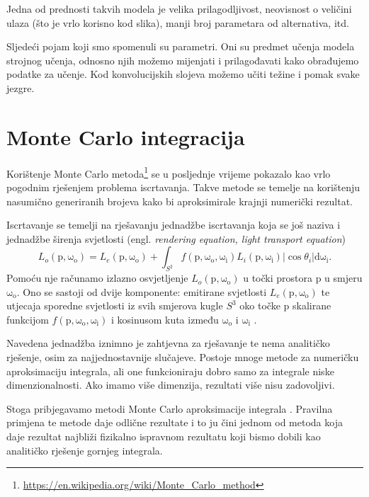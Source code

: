 \documentclass[times, utf8, seminar, numeric]{fer}
\newcommand{\eng}[1]{(engl. \textsl{#1}\/)}
\newcommand{\vect}[1]{\bm{\mathrm{#1}}}
\begin{document}
Jedna od prednosti takvih modela je velika prilagodljivost, neovisnost o veličini ulaza (što je
vrlo korisno kod slika), manji broj parametara od alternativa, itd.

Sljedeći pojam koji smo spomenuli su parametri. Oni su predmet učenja modela strojnog učenja,
odnosno njih možemo mijenjati i prilagođavati kako obrađujemo podatke za učenje. Kod
konvolucijskih slojeva možemo učiti težine i pomak svake jezgre.


\section{Monte Carlo integracija}
Korištenje Monte Carlo metoda\footnote{\url{https://en.wikipedia.org/wiki/Monte_Carlo_method}} se
u posljednje vrijeme pokazalo kao vrlo pogodnim rješenjem problema iscrtavanja. Takve metode se
temelje na korištenju nasumično generiranih brojeva kako bi aproksimirale krajnji numerički
rezultat.

Iscrtavanje se temelji na rješavanju jednadžbe iscrtavanja koja se još naziva i jednadžbe širenja
svjetlosti \eng{rendering equation, light transport equation}
\begin{equation} \label{eq:1}
  L_o(\vect{p}, \vect{\omega_o}) = L_e(\vect{p}, \vect{\omega_o}) + \int_{S^2} f(\vect{p}, \vect{\omega_o}, \vect{\omega_i})
  L_i(\vect{p}, \vect{\omega_i}) |\cos\theta_i| \mathrm{d}\vect{\omega_i}.
  \end{equation}
Pomoću nje računamo izlazno osvjetljenje $L_o(\vect{p}, \vect{\omega_o})$ u točki prostora $\vect{p}$ u smjeru $\vect{\omega_o}$. Ono se sastoji od dvije komponente:
emitirane svjetlosti $L_e(\vect{p}, \vect{\omega_o})$ te utjecaja sporedne
svjetlosti iz svih smjerova kugle $S^3$ oko točke $\vect{p}$ skalirane
funkcijom $f(\vect{p}, \vect{\omega_o}, \vect{\omega_i})$ i kosinusom kuta između $\vect{\omega_o}$ i $\vect{\omega_i}$ \cite{pbrbook}.

Navedena jednadžba iznimno je zahtjevna za rješavanje te nema analitičko
rješenje, osim za najjednostavnije slučajeve.
Postoje mnoge metode za numeričku aproksimaciju integrala, ali one funkcioniraju dobro samo za
integrale niske dimenzionalnosti. Ako imamo više dimenzija,
rezultati više nisu zadovoljivi.

Stoga pribjegavamo metodi
Monte Carlo aproksimacije integrala \cite{pbrbook}. Pravilna primjena te metode daje odlične rezultate i to ju čini jednom od metoda
koja daje rezultat najbliži fizikalno ispravnom rezultatu koji bismo dobili kao analitičko rješenje gornjeg integrala.
\end{document}

